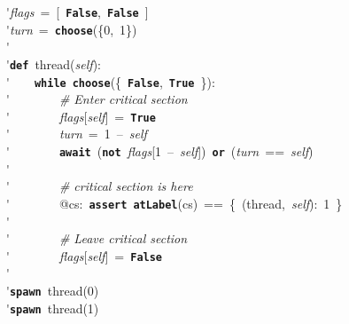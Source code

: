 \'\>\textit{flags}~=~[~\texttt{\textbf{False}},~\texttt{\textbf{False}}~]\\

\'\>\textit{turn}~=~\texttt{\textbf{choose}}(\{0,~1\})\\

\'\>\\

\'\>\texttt{\textbf{def}}~thread(\textit{self}):\\

\'\>~~~~\texttt{\textbf{while}}~\texttt{\textbf{choose}}(\{~\texttt{\textbf{False}},~\texttt{\textbf{True}}~\}):\\

\'\>~~~~~~~~\emph{\# Enter critical section}\\

\'\>~~~~~~~~\textit{flags}[\textit{self}]~=~\texttt{\textbf{True}}\\

\'\>~~~~~~~~\textit{turn}~=~1~--~\textit{self}\\

\'\>~~~~~~~~\texttt{\textbf{await}}~(\texttt{\textbf{not}}~\textit{flags}[1~--~\textit{self}])~\texttt{\textbf{or}}~(\textit{turn}~==~\textit{self})\\

\'\>\\

\'\>~~~~~~~~\emph{\# critical section is here}\\

\'\>~~~~~~~~@cs:~\texttt{\textbf{assert}}~\texttt{\textbf{atLabel}}(cs)~==~\{~(thread,~\textit{self}):~1~\}\\

\'\>\\

\'\>~~~~~~~~\emph{\# Leave critical section}\\

\'\>~~~~~~~~\textit{flags}[\textit{self}]~=~\texttt{\textbf{False}}\\

\'\>\\

\'\>\texttt{\textbf{spawn}}~thread(0)\\

\'\>\texttt{\textbf{spawn}}~thread(1)
